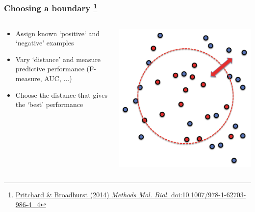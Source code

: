 \begin{frame}
  \frametitle{Choosing a boundary
  \footnote{\tiny{\href{http://dx.doi.org/10.1007/978-1-62703-986-4_4}{Pritchard \& Broadhurst (2014) \textit{Methods Mol. Biol.} doi:10.1007/978-1-62703-986-4\_4}}}
}
  \begin{columns}[T]
    \begin{column}{5cm}  
      \begin{itemize}  
        \item \textcolor{hutton_green}{Assign known `positive` and `negative' examples}
        \item \textcolor{hutton_blue}{Vary `distance' and measure predictive performance (F-measure, AUC, $\ldots$)}
        \item \textcolor{hutton_purple}{Choose the distance that gives the `best' performance}
        \end{itemize}  
      \end{column}
    \begin{column}{5cm}  
      \includegraphics[width=1\textwidth]{images/finding_effectors11}    
    \end{column}
  \end{columns} 
\end{frame}

